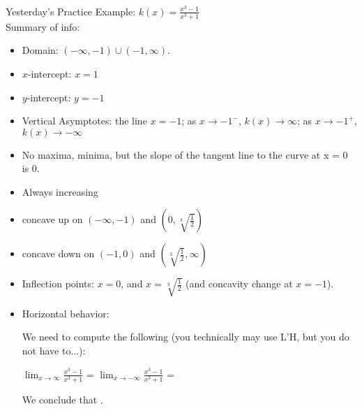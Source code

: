 \documentclass[11pt,fleqn]{article}
\renewcommand{\d}{\displaystyle}
\begin{document}
\vspace*{-0.7in}

\begin{center}
  \Large{}\\
\end{center}


Yesterday's Practice Example: $\d k(x) = \frac{x^{3} - 1}{x^{3}+1}$\\


 Summary of info:
  \begin{itemize}
  \item Domain: $(-\infty, -1) \cup (-1, \infty)$.
  \item $x$-intercept: $x = 1$
  \item $y$-intercept: $y = -1$
\item Vertical Asymptotes: the line $x = -1$; as $x \to -1^{-}$, $k(x)\to \infty$; as $x \to -1^{+}$, $k(x) \to -\infty$ 
\item No maxima, minima, but the slope of the tangent line to the curve at x = 0 is 0.
\item Always increasing
\item concave up on $(-\infty, -1)$ and $(0, \sqrt[3]{\frac{1}{2}})$
\item concave down on $(-1, 0)$ and $(\sqrt[3]{\frac{1}{2}}, \infty)$
\item Inflection points: $x = 0$, and $x = \sqrt[3]{\frac{1}{2}}$ (and concavity change at $x = -1$).
\item Horizontal behavior: %

We need to compute the following (you technically may use L'H, but you do not have to...):

$\d \lim_{x\to \infty} \frac{x^{3} - 1}{x^{3}+1}$ =  \hfill  $\d \lim_{x\to -\infty} \frac{x^{3} - 1}{x^{3}+1}$ = \hspace{.3\textwidth}

\vfill
We conclude that \hrulefill.
\end{itemize}
\end{document}
